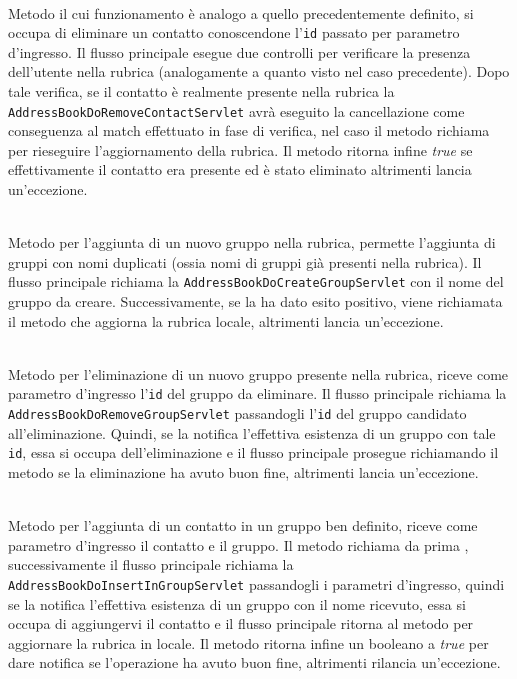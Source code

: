 \begin{description}
	\item{}\\
Metodo il cui funzionamento è analogo a quello precedentemente definito, si occupa di eliminare un contatto conoscendone l'\texttt{id} passato per parametro d'ingresso. Il flusso principale esegue due controlli per verificare la presenza dell'utente nella rubrica (analogamente a quanto visto nel caso precedente). 
Dopo tale verifica, se il contatto è realmente presente nella rubrica la  \texttt{AddressBookDoRemoveContactServlet} avrà eseguito la cancellazione come conseguenza al match effettuato in fase di verifica, nel caso il metodo richiama  per rieseguire l'aggiornamento della rubrica. Il metodo ritorna infine \textit{true} se effettivamente il contatto era presente ed è stato eliminato altrimenti lancia un'eccezione.

	\item{}\\
	Metodo per l'aggiunta di un nuovo gruppo nella rubrica, permette l'aggiunta di gruppi con nomi duplicati (ossia nomi di gruppi già presenti nella rubrica). Il flusso principale richiama la  \texttt{AddressBookDoCreateGroupServlet} con il nome del gruppo da creare. Successivamente, se la  ha dato  esito positivo, viene richiamata il metodo  che aggiorna la rubrica locale, altrimenti lancia un'eccezione.
	
	\item{}\\
	Metodo per l'eliminazione di un nuovo gruppo presente nella rubrica, riceve come parametro d'ingresso l'\texttt{id} del gruppo da eliminare. Il flusso principale richiama la  \texttt{AddressBookDoRemoveGroupServlet} passandogli l'\texttt{id} del gruppo candidato all'eliminazione. Quindi, se la  notifica l'effettiva esistenza di un gruppo con tale \texttt{id}, essa si occupa dell'eliminazione e il flusso principale prosegue richiamando il metodo  se la eliminazione ha avuto buon fine, altrimenti lancia un'eccezione.
	
	\item{}\\
	Metodo per l'aggiunta di un contatto in un gruppo ben definito, riceve come parametro d'ingresso il contatto e il gruppo.
Il metodo richiama da prima , successivamente il flusso principale richiama la  \texttt{AddressBookDoInsertInGroupServlet} passandogli i parametri d'ingresso, quindi se la  notifica l'effettiva esistenza di un gruppo con il nome ricevuto, essa si occupa di aggiungervi il contatto e il flusso principale ritorna al metodo  per aggiornare la rubrica in locale. Il metodo ritorna infine un  booleano a \textit{true} per dare notifica se l'operazione ha avuto buon fine, altrimenti rilancia un'eccezione.
	

\end{description}
